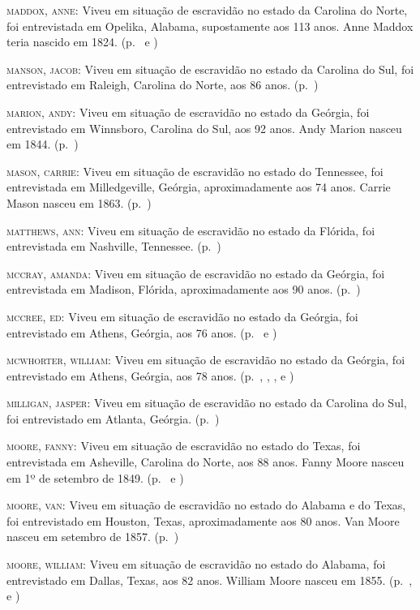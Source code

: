 \begin{Parskip}
\textsc{maddox, anne:} Viveu em situação de escravidão no estado da Carolina do Norte, foi
entrevistada em Opelika, Alabama, supostamente aos 113 anos. Anne Maddox
teria nascido em 1824. (p.~\pageref{ref179} e \pageref{ref180})

\textsc{manson, jacob:} Viveu em situação de escravidão no estado da Carolina do Sul, foi
entrevistado em Raleigh, Carolina do Norte, aos 86 anos. (p.~\pageref{ref181})

\textsc{marion, andy:} Viveu em situação de escravidão no estado da Geórgia, foi entrevistado em
Winnsboro, Carolina do Sul, aos 92 anos. Andy Marion nasceu em 1844. (p.~\pageref{ref182})

\textsc{mason, carrie:} Viveu em situação de escravidão no estado do Tennessee, foi entrevistada
em Milledgeville, Geórgia, aproximadamente aos 74 anos. Carrie Mason
nasceu em 1863. (p.~\pageref{ref183})

\textsc{matthews, ann:} Viveu em situação de escravidão no estado da Flórida, foi entrevistada
em Nashville, Tennessee. (p.~\pageref{ref184})

\textsc{mccray, amanda:} Viveu em situação de escravidão no estado da Geórgia, foi entrevistada
em Madison, Flórida, aproximadamente aos 90 anos. (p.~\pageref{ref185})

\textsc{mccree, ed:} Viveu em situação de escravidão no estado da Geórgia, foi entrevistado em
Athens, Geórgia, aos 76 anos. (p.~\pageref{ref186} e \pageref{ref187})

\textsc{mcwhorter, william:} Viveu em situação de escravidão no estado da Geórgia, foi
entrevistado em Athens, Geórgia, aos 78 anos. (p.~\pageref{ref188}, \pageref{ref189}, \pageref{ref190}, \pageref{ref191} e \pageref{ref192})

\textsc{milligan, jasper:} Viveu em situação de escravidão no estado da Carolina do Sul, foi
entrevistado em Atlanta, Geórgia. (p.~\pageref{ref193})

\textsc{moore, fanny:} Viveu em situação de escravidão no estado do Texas, foi entrevistada em
Asheville, Carolina do Norte, aos 88 anos. Fanny Moore nasceu em 1º de
setembro de 1849. (p.~\pageref{ref194} e \pageref{ref195})

\textsc{moore, van:} Viveu em situação de escravidão no estado do Alabama e do Texas, foi
entrevistado em Houston, Texas, aproximadamente aos 80 anos. Van Moore
nasceu em setembro de 1857. (p.~\pageref{ref196})

\textsc{moore, william:} Viveu em situação de escravidão no estado do Alabama, foi entrevistado
em Dallas, Texas, aos 82 anos. William Moore nasceu em 1855. (p.~\pageref{ref197}, \pageref{ref198} e \pageref{ref199})


\end{Parskip}
